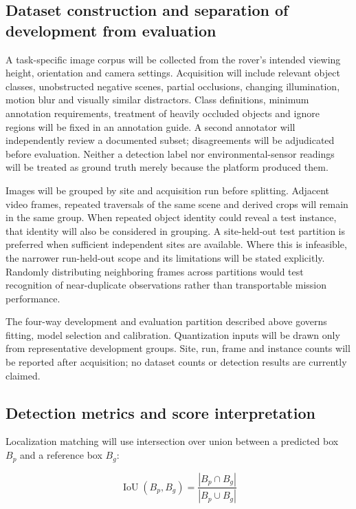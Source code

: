 \documentclass[11pt,letterpaper]{article}
\begin{document}
\subsection{Dataset construction and separation of development from evaluation}

A task-specific image corpus will be collected from the rover's intended viewing height, orientation and camera settings. Acquisition will include relevant object classes, unobstructed negative scenes, partial occlusions, changing illumination, motion blur and visually similar distractors. Class definitions, minimum annotation requirements, treatment of heavily occluded objects and ignore regions will be fixed in an annotation guide. A second annotator will independently review a documented subset; disagreements will be adjudicated before evaluation. Neither a detection label nor environmental-sensor readings will be treated as ground truth merely because the platform produced them.

Images will be grouped by site and acquisition run before splitting. Adjacent video frames, repeated traversals of the same scene and derived crops will remain in the same group. When repeated object identity could reveal a test instance, that identity will also be considered in grouping. A site-held-out test partition is preferred when sufficient independent sites are available. Where this is infeasible, the narrower run-held-out scope and its limitations will be stated explicitly. Randomly distributing neighboring frames across partitions would test recognition of near-duplicate observations rather than transportable mission performance.

The four-way development and evaluation partition described above governs fitting, model selection and calibration. Quantization inputs will be drawn only from representative development groups. Site, run, frame and instance counts will be reported after acquisition; no dataset counts or detection results are currently claimed.

\subsection{Detection metrics and score interpretation}

Localization matching will use intersection over union between a predicted box \(B_p\) and a reference box \(B_g\):

\begin{equation}
\operatorname{IoU}(B_p,B_g)=
\frac{|B_p\cap B_g|}{|B_p\cup B_g|}
\label{eq:28}
\end{equation}
\end{document}
